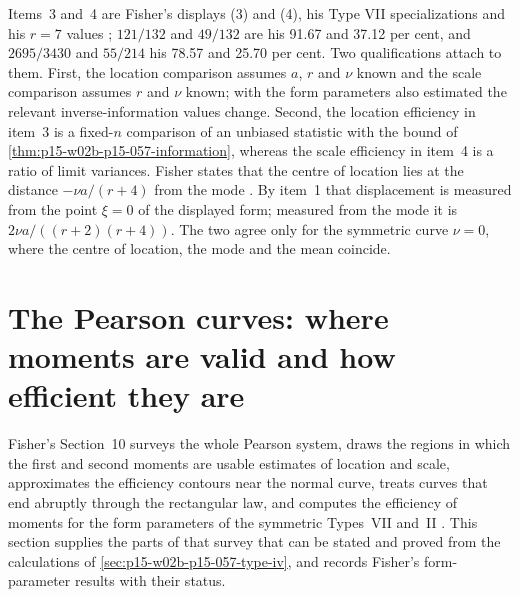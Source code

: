Items~3 and~4 are Fisher's displays (3) and (4), his Type VII
specializations and his \(r=7\) values
\cite[pp.~341--342]{Fisher1922Foundations}; \(121/132\) and \(49/132\) are
his 91.67 and 37.12 per cent, and \(2695/3430\) and \(55/214\) his 78.57
and 25.70 per cent. Two qualifications attach to them. First, the
location comparison assumes \(a\), \(r\) and \(\nu\) known and the scale
comparison assumes \(r\) and \(\nu\) known; with the form parameters also
estimated the relevant inverse-information values change. Second, the
location efficiency in item~3 is a fixed-\(n\) comparison of an unbiased
statistic with the bound of \cref{thm:p15-w02b-p15-057-information}, whereas
the scale efficiency in item~4 is a ratio of limit variances. Fisher
states that the centre of location lies at the distance \(-\nu a/(r+4)\)
from the mode \cite[p.~340]{Fisher1922Foundations}. By item~1 that
displacement is measured from the point \(\xi=0\) of the displayed form;
measured from the mode it is \(2\nu a/((r+2)(r+4))\). The two agree only
for the symmetric curve \(\nu=0\), where the centre of location, the mode
and the mean coincide.

\section{The Pearson curves: where moments are valid and how efficient they are}
\label{sec:p15-w02b-p15-057-pearson}

Fisher's Section~10 surveys the whole Pearson system, draws the regions in
which the first and second moments are usable estimates of location and
scale, approximates the efficiency contours near the normal curve, treats
curves that end abruptly through the rectangular law, and computes the
efficiency of moments for the form parameters of the symmetric Types~VII
and~II \cite[pp.~342--355]{Fisher1922Foundations}. This section supplies
the parts of that survey that can be stated and proved from the
calculations of \cref{sec:p15-w02b-p15-057-type-iv}, and records Fisher's
form-parameter results with their status.

